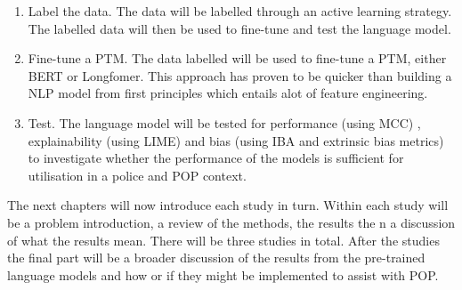 \begin{enumerate}
    \item Label the data. The data will be labelled through an active learning strategy. The labelled data will then be used to fine-tune and test the language model.
    
    \item Fine-tune a PTM. The data labelled will be used to fine-tune a PTM, either BERT or Longfomer. This approach has proven to be quicker than building a NLP model from first principles which entails alot of feature engineering.
    
    \item Test. The language model will be tested for performance (using MCC) , explainability (using LIME)  and bias (using IBA and extrinsic bias metrics) to investigate whether the performance of the models is sufficient for utilisation in a police and POP context. 
\end{enumerate}


The next chapters will now introduce each study in turn. Within each study will be a problem introduction, a review of the methods, the results the n a discussion of what the results mean. There will be three studies in total. After the studies the final part will be a broader discussion of the results from the pre-trained language models and how or if they might be implemented to assist with POP.

